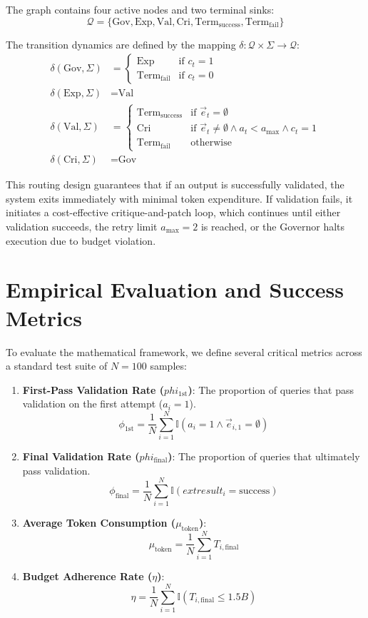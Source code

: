 \documentclass[10pt,journal,compsoc]{IEEEtran}
\begin{document}
The graph contains four active nodes and two terminal sinks:
\[ \mathcal{Q} = \{ \text{Gov}, \text{Exp}, \text{Val}, \text{Cri}, \text{Term}_{\text{success}}, \text{Term}_{\text{fail}} \} \]

The transition dynamics are defined by the mapping $\delta: \mathcal{Q} \times \Sigma \to \mathcal{Q}$:
\begin{align*}
\delta(\text{Gov}, \Sigma) &= \begin{cases} \text{Exp} & \text{if } c_t = 1 \\ \text{Term}_{\text{fail}} & \text{if } c_t = 0 \end{cases} \\
\delta(\text{Exp}, \Sigma) &= \text{Val} \\
\delta(\text{Val}, \Sigma) &= \begin{cases} \text{Term}_{\text{success}} & \text{if } \vec{e}_t = \emptyset \\ \text{Cri} & \text{if } \vec{e}_t \neq \emptyset \land a_t < a_{\text{max}} \land c_t = 1 \\ \text{Term}_{\text{fail}} & \text{otherwise} \end{cases} \\
\delta(\text{Cri}, \Sigma) &= \text{Gov}
\end{align*}

This routing design guarantees that if an output is successfully validated, the system exits immediately with minimal token expenditure. If validation fails, it initiates a cost-effective critique-and-patch loop, which continues until either validation succeeds, the retry limit $a_{\text{max}} = 2$ is reached, or the Governor halts execution due to budget violation.

\section{Empirical Evaluation and Success Metrics}
To evaluate the mathematical framework, we define several critical metrics across a standard test suite of $N = 100$ samples:
\begin{enumerate}
\item \textbf{First-Pass Validation Rate ($phi_{\text{1st}}$)}: The proportion of queries that pass validation on the first attempt ($a_i = 1$).
\[ \phi_{\text{1st}} = \frac{1}{N} \sum_{i=1}^N \mathbb{I}(a_i = 1 \land \vec{e}_{i,1} = \emptyset) \]
\item \textbf{Final Validation Rate ($phi_{\text{final}}$)}: The proportion of queries that ultimately pass validation.
\[ \phi_{\text{final}} = \frac{1}{N} \sum_{i=1}^N \mathbb{I}(	ext{result}_i = \text{success}) \]
\item \textbf{Average Token Consumption ($\mu_{\text{token}}$)}:
\[ \mu_{\text{token}} = \frac{1}{N} \sum_{i=1}^N T_{i,\text{final}} \]
\item \textbf{Budget Adherence Rate ($\eta$)}:
\[ \eta = \frac{1}{N} \sum_{i=1}^N \mathbb{I}(T_{i,\text{final}} \le 1.5 B) \]
\end{enumerate}
\end{document}
